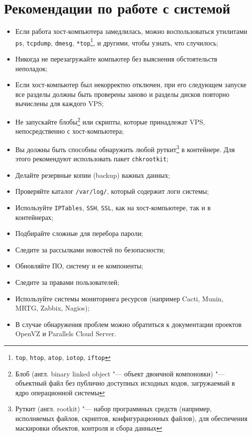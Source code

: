 \section{Рекомендации по работе с системой}
\begin{itemize}
    \item Если работа хост-компьютера замедлилась, можно воспользоваться утилитами \texttt{ps}, \texttt{tcpdump}, \texttt{dmesg}, \texttt{*top}\footnote{\texttt{top}, \texttt{htop}, \texttt{atop}, \texttt{iotop}, \texttt{iftop}}, и другими, чтобы узнать, что случилось;
    \item Никогда не перезагружайте компьютер без выяснения обстоятельств неполадок;
    \item Если хост-компьютер был некорректно отключен, при его следующем запуске все разделы должны быть проверены заново и разделы дисков повторно вычислены для каждого VPS;
    \item Не запускайте блобы\footnote{Блоб (англ. binary linked object "--- объект двоичной компоновки) "--- объектный файл без публично доступных исходных кодов, загружаемый в ядро операционной системы} или скрипты, которые принадлежат VPS, непосредственно с хост-компьютера;
    \item Вы должны быть способны обнаружить любой руткит\footnote{Руткит (англ. rootkit) "--- набор программных средств (например, исполняемых файлов, скриптов, конфигурационных файлов), для обеспечения маскировки объектов, контроля и сбора данных} в контейнере. Для этого рекомендуют использовать пакет \texttt{chkrootkit};
    \item Делайте резервные копии (backup) важных данных;
    \item Проверяйте каталог \texttt{/var/log/}, который содержит логи системы;
    \item Используйте \texttt{IPTables}, \texttt{SSH}, \texttt{SSL}, как на хост-компьютере, так и в контейнерах;
    \item Подбирайте сложные для перебора пароли;
    \item Следите за рассылками новостей по безопасности;
    \item Обновляйте ПО, систему и ее компоненты;
    \item Следите за правами пользователей;
    \item Используйте системы мониторинга ресурсов (например Cacti, Munin, MRTG, Zabbix, Nagios);
    \item В случае обнаружения проблем можно обратиться к документации проектов OpenVZ и Parallels Cloud Server.
\end{itemize}

\clearpage
